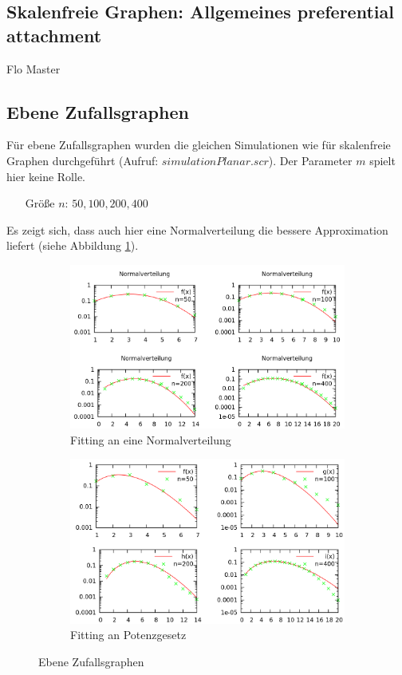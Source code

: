 \documentclass[10pt]{article}
\begin{document}
\subsection{Skalenfreie Graphen: Allgemeines preferential attachment}
Flo Master

\subsection{Ebene Zufallsgraphen}
Für ebene Zufallsgraphen wurden die gleichen Simulationen wie für skalenfreie Graphen durchgeführt (Aufruf: $simulationPlanar.scr$). Der Parameter $m$ spielt hier keine Rolle.
\begin{itemize}
\item[\quad Größe $n$:] $50,100,200,400$
\end{itemize}
Es zeigt sich, dass auch hier eine Normalverteilung die bessere Approximation liefert (siehe Abbildung \ref{fig:planar}).

\begin{figure}[htb!]
\begin{subfigure}{.5\textwidth}
  \centering
  \includegraphics[width=\linewidth]{../Results/Normal_Planar_logscale.png}
  \caption{Fitting an eine Normalverteilung}
\end{subfigure}%
\begin{subfigure}{.5\textwidth}
  \centering
  \includegraphics[width=\linewidth]{../Results/Power_Planar_logscale.png}
  \caption{Fitting an Potenzgesetz}
\end{subfigure}
\caption{Ebene Zufallsgraphen}
\label{fig:planar}
\end{figure}
\end{document}

